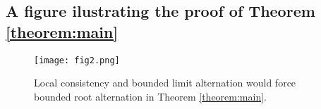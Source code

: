 \subsection*{A figure ilustrating the proof of Theorem \ref{theorem:main}}
\begin{figure}
\begin{center}
\texttt{[image: fig2.png]}
\caption{Local consistency and bounded limit alternation would force bounded root alternation in Theorem \ref{theorem:main}. 
\label{figure:consistency}} 
\end{center}
\end{figure}

